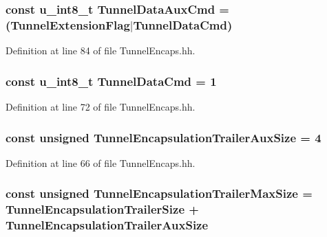 \subsubsection[{Tunnel\+Data\+Aux\+Cmd}]{\setlength{\rightskip}{0pt plus 5cm}const u\+\_\+int8\+\_\+t Tunnel\+Data\+Aux\+Cmd = ({\bf Tunnel\+Extension\+Flag}$\vert${\bf Tunnel\+Data\+Cmd})}\label{TunnelEncaps_8hh_a7c4e5219a9d33f517367bb81498cd1b9}


Definition at line 84 of file Tunnel\+Encaps.\+hh.

\subsubsection[{Tunnel\+Data\+Cmd}]{\setlength{\rightskip}{0pt plus 5cm}const u\+\_\+int8\+\_\+t Tunnel\+Data\+Cmd = 1}\label{TunnelEncaps_8hh_adbc943889677ba2928a4b8339a53192c}


Definition at line 72 of file Tunnel\+Encaps.\+hh.

\subsubsection[{Tunnel\+Encapsulation\+Trailer\+Aux\+Size}]{\setlength{\rightskip}{0pt plus 5cm}const unsigned Tunnel\+Encapsulation\+Trailer\+Aux\+Size = 4}\label{TunnelEncaps_8hh_afa227c427cc6aed67cd97bd7b2ed6181}


Definition at line 66 of file Tunnel\+Encaps.\+hh.

\subsubsection[{Tunnel\+Encapsulation\+Trailer\+Max\+Size}]{\setlength{\rightskip}{0pt plus 5cm}const unsigned Tunnel\+Encapsulation\+Trailer\+Max\+Size = {\bf Tunnel\+Encapsulation\+Trailer\+Size} + {\bf Tunnel\+Encapsulation\+Trailer\+Aux\+Size}}\label{TunnelEncaps_8hh_a9d54e931db0a16eaba303ec4ce183d98}


